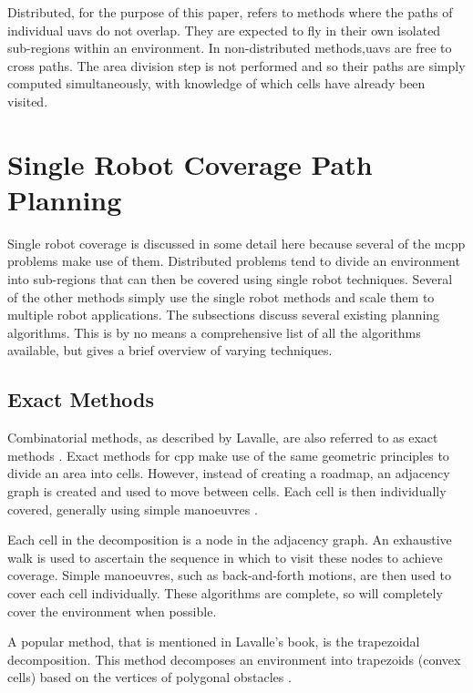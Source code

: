 Distributed, for the purpose of this paper, refers to methods where the paths of individual \acp{uav} do not overlap. They are expected to fly in their own isolated sub-regions within an environment. In non-distributed methods,\acsp{uav} are free to cross paths. The area division step is not performed and so their paths are simply computed simultaneously, with knowledge of which cells have already been visited. \cite{Juan2018}

\section{Single Robot Coverage Path Planning}
\label{sec:lit SR CPP}
Single robot coverage is discussed in some detail here because several of the \ac{mcpp} problems make use of them. Distributed problems tend to divide an environment into sub-regions that can then be covered using single robot techniques. Several of the other methods simply use the single robot methods and scale them to multiple robot applications. The subsections discuss several existing planning algorithms. This is by no means a comprehensive list of all the algorithms available, but gives a brief overview of varying techniques.%
\subsection{Exact Methods}
\label{sec:lit SR CPP - Exact}
Combinatorial methods, as described by Lavalle, are also referred to as exact methods \cite{Lavalle2006}. Exact methods for \ac{cpp} make use of the same geometric principles to divide an area into cells. However, instead of creating a roadmap, an adjacency graph is created and used to move between cells. Each cell is then individually covered, generally using simple manoeuvres \cite{CPP-Survey-2013}. 

Each cell in the decomposition is a node in the adjacency graph. An exhaustive walk is used to ascertain the sequence in which to visit these nodes to achieve coverage. Simple manoeuvres, such as back-and-forth motions, are then used to cover each cell individually. These algorithms are complete, so will completely cover the environment when possible. \cite{Choset-Bous1997}

A popular method, that is mentioned in Lavalle's book, is the trapezoidal decomposition. This method decomposes an environment into trapezoids (convex cells) based on the vertices of polygonal obstacles \cite{Lavalle2006}.

